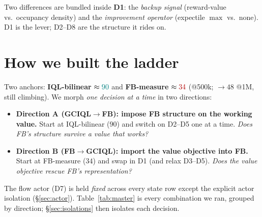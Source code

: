 \documentclass[11pt]{article}
\newcommand{\B}[1]{\textbf{#1}}
\newcommand{\good}[1]{\textcolor{teal}{#1}}
\newcommand{\bad}[1]{\textcolor{red!70!black}{#1}}
\begin{document}
\noindent Two differences are bundled inside \B{D1}: the \emph{backup signal}
(reward-value vs.\ occupancy density) and the \emph{improvement operator}
(expectile $\max$ vs.\ none). D1 is the lever; D2--D8 are the structure it rides on.

\section{How we built the ladder}
Two anchors: \B{IQL-bilinear} $\approx\good{90}$ and \B{FB-measure}
$\approx\bad{34}$ (@500k; $\to48$ @1M, still climbing). We morph \emph{one
decision at a time} in two directions:
\begin{itemize}[nosep,leftmargin=1.4em]
\item \B{Direction A (GCIQL$\to$FB): impose FB structure on the working value.}
  Start at IQL-bilinear ($90$) and switch on D2--D5 one at a time. \emph{Does FB's
  structure survive a value that works?}
\item \B{Direction B (FB$\to$GCIQL): import the value objective into FB.}
  Start at FB-measure ($34$) and swap in D1 (and relax D3--D5). \emph{Does the
  value objective rescue FB's representation?}
\end{itemize}
The flow actor (D7) is held \emph{fixed} across every state row except the explicit
actor isolation (\S\ref{sec:actor}). Table~\ref{tab:master} is every combination we
ran, grouped by direction; \S\ref{sec:isolations} then isolates each decision.
\end{document}
